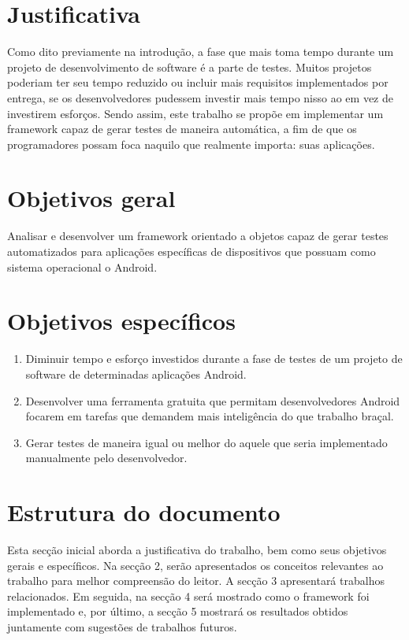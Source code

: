 \documentclass[
    12pt,       %
    openright,      %
    twoside,      %
    a4paper,      %
    english,      %
    french,       %
    spanish,      %
    brazil,       %
    ]{abntex2}
\begin{document}
  \section{Justificativa}
      Como dito previamente na introdução, a fase que mais toma tempo durante
      um projeto de desenvolvimento de software é a parte de testes. Muitos
      projetos poderiam ter seu tempo reduzido ou incluir mais requisitos
      implementados por entrega, se os desenvolvedores pudessem investir mais
      tempo nisso ao em vez de investirem esforços. Sendo assim, este
      trabalho se propõe em implementar um framework capaz de gerar testes
      de maneira automática, a fim de que os programadores possam foca
      naquilo que realmente importa: suas aplicações.


  \section{Objetivos geral}
      Analisar e desenvolver um framework orientado a objetos capaz de gerar testes automatizados para
      aplicações específicas de dispositivos que possuam como sistema operacional o Android.

  \section{Objetivos específicos}
  \begin{enumerate}
      \item Diminuir tempo e esforço investidos durante a fase de testes de um projeto de software
            de determinadas aplicações Android.
      \item Desenvolver uma ferramenta gratuita que permitam desenvolvedores Android focarem
            em tarefas que demandem mais inteligência do que trabalho braçal.
      \item Gerar testes de maneira igual ou melhor do aquele que seria
      implementado manualmente pelo desenvolvedor.
  \end{enumerate}

  \section{Estrutura do documento}
      Esta secção inicial aborda a justificativa do trabalho, bem como seus
      objetivos gerais e específicos. Na secção 2, serão apresentados os
      conceitos relevantes ao trabalho para melhor compreensão do leitor.
      A secção 3 apresentará trabalhos relacionados. Em seguida,
      na secção 4 será mostrado como o framework foi implementado e, por
      último, a secção 5 mostrará os resultados obtidos juntamente com
      sugestões de trabalhos futuros.
\end{document}
